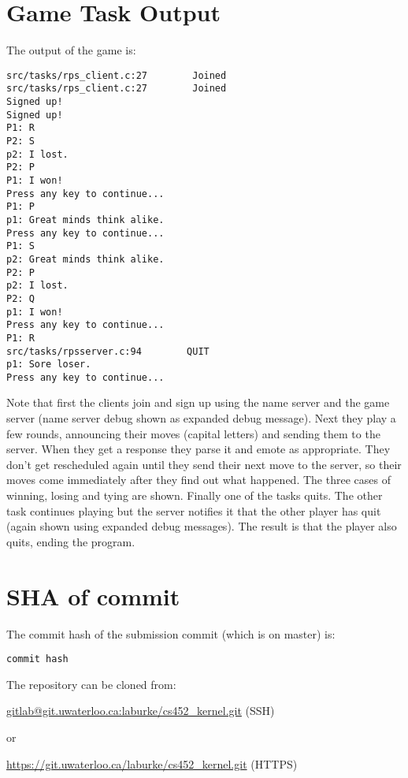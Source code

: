 \documentclass{article}
\begin{document}
\section*{Game Task Output}

The output of the game is:

\begin{verbatim}
src/tasks/rps_client.c:27        Joined
src/tasks/rps_client.c:27        Joined
Signed up!
Signed up!
P1: R
P2: S
p2: I lost.
P2: P
P1: I won!
Press any key to continue...
P1: P
p1: Great minds think alike.
Press any key to continue...
P1: S
p2: Great minds think alike.
P2: P
p2: I lost.
P2: Q
p1: I won!
Press any key to continue...
P1: R
src/tasks/rpsserver.c:94        QUIT
p1: Sore loser.
Press any key to continue...
\end{verbatim}

Note that first the clients join and sign up using the name server and the game
server (name server debug shown as expanded debug message). Next they play a few
rounds, announcing their moves (capital letters) and sending them to the server.
When they get a response they parse it and emote as appropriate. They don't get
rescheduled again until they send their next move to the server, so their moves
come immediately after they find out what happened. The three cases of winning,
losing and tying are shown. Finally one of the tasks quits. The other task
continues playing but the server notifies it that the other player has quit
(again shown using expanded debug messages). The result is that the player also
quits, ending the program.

\section*{SHA of commit}

The commit hash of the submission commit (which is on master) is:

\texttt{{{{commit hash}}}}

The repository can be cloned from:

\url{gitlab@git.uwaterloo.ca:laburke/cs452_kernel.git} (SSH)

or

\url{https://git.uwaterloo.ca/laburke/cs452_kernel.git} (HTTPS)
\end{document}
